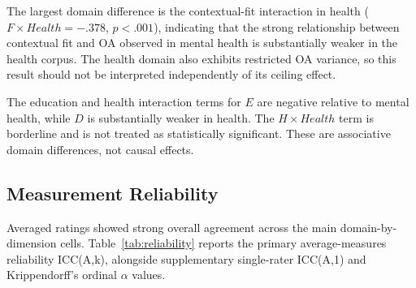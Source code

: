 \documentclass[manuscript,review,anonymous]{acmart}
\begin{document}
The largest domain difference is the contextual-fit interaction in health ($F\times Health=-.378$, $p<.001$), indicating that the strong relationship between contextual fit and OA observed in mental health is substantially weaker in the health corpus. The health domain also exhibits restricted OA variance, so this result should not be interpreted independently of its ceiling effect.

The education and health interaction terms for $E$ are negative relative to mental health, while $D$ is substantially weaker in health. The $H\times Health$ term is borderline and is not treated as statistically significant. These are associative domain differences, not causal effects.

\subsection{Measurement Reliability}

Averaged ratings showed strong overall agreement across the main domain-by-dimension cells. Table~\ref{tab:reliability} reports the primary average-measures reliability ICC(A,k), alongside supplementary single-rater ICC(A,1) and Krippendorff's ordinal $\alpha$ values.
\end{document}
